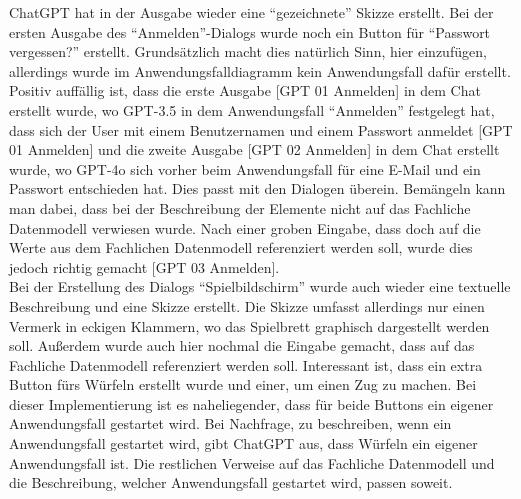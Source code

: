 ChatGPT hat in der Ausgabe wieder eine ``gezeichnete'' Skizze erstellt. Bei der ersten Ausgabe des ``Anmelden''-Dialogs wurde noch ein Button 
für ``Passwort vergessen?'' erstellt. Grundsätzlich macht dies natürlich Sinn, hier einzufügen, allerdings wurde im Anwendungsfalldiagramm 
kein Anwendungsfall dafür erstellt. Positiv auffällig ist, dass die erste Ausgabe [GPT 01 Anmelden] in dem Chat erstellt wurde, wo GPT-3.5 
in dem Anwendungsfall ``Anmelden'' festgelegt hat, dass sich der User mit einem Benutzernamen und einem Passwort anmeldet [GPT 01 Anmelden] 
und die zweite Ausgabe [GPT 02 Anmelden] in dem Chat erstellt wurde, wo GPT-4o sich vorher beim Anwendungsfall für eine E-Mail und ein 
Passwort entschieden hat. Dies passt mit den Dialogen überein. Bemängeln kann man dabei, dass bei der Beschreibung der Elemente nicht auf 
das Fachliche Datenmodell verwiesen wurde. Nach einer groben Eingabe, dass doch auf die Werte aus dem Fachlichen Datenmodell referenziert 
werden soll, wurde dies jedoch richtig gemacht [GPT 03 Anmelden].\\
Bei der Erstellung des Dialogs ``Spielbildschirm'' wurde auch wieder eine textuelle Beschreibung und eine Skizze erstellt. Die Skizze umfasst 
allerdings nur einen Vermerk in eckigen Klammern, wo das Spielbrett graphisch dargestellt werden soll. Außerdem wurde auch hier nochmal die 
Eingabe gemacht, dass auf das Fachliche Datenmodell referenziert werden soll. Interessant ist, dass ein extra Button fürs Würfeln erstellt 
wurde und einer, um einen Zug zu machen. Bei dieser Implementierung ist es naheliegender, dass für beide Buttons ein eigener Anwendungsfall 
gestartet wird. Bei Nachfrage, zu beschreiben, wenn ein Anwendungsfall gestartet wird, gibt ChatGPT aus, dass Würfeln ein eigener 
Anwendungsfall ist. Die restlichen Verweise auf das Fachliche Datenmodell und die Beschreibung, welcher Anwendungsfall gestartet wird, 
passen soweit.

